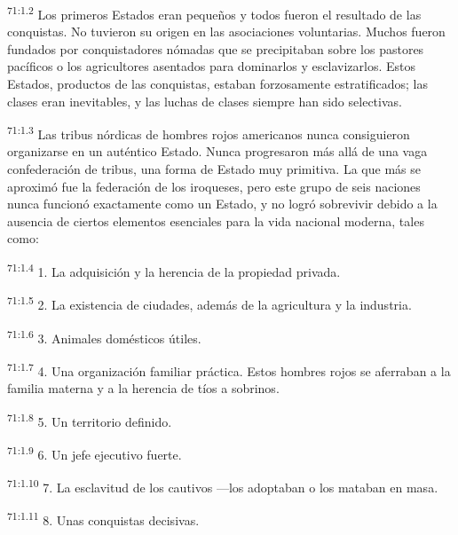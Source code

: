 \documentclass[twoside, 11pt]{book}
\begin{document}
\par
\textsuperscript{71:1.2} Los primeros Estados eran pequeños y todos fueron el resultado de las conquistas. No tuvieron su origen en las asociaciones voluntarias. Muchos fueron fundados por conquistadores nómadas que se precipitaban sobre los pastores pacíficos o los agricultores asentados para dominarlos y esclavizarlos. Estos Estados, productos de las conquistas, estaban forzosamente estratificados; las clases eran inevitables, y las luchas de clases siempre han sido selectivas.

\par
\textsuperscript{71:1.3} Las tribus nórdicas de hombres rojos americanos nunca consiguieron organizarse en un auténtico Estado. Nunca progresaron más allá de una vaga confederación de tribus, una forma de Estado muy primitiva. La que más se aproximó fue la federación de los iroqueses, pero este grupo de seis naciones nunca funcionó exactamente como un Estado, y no logró sobrevivir debido a la ausencia de ciertos elementos esenciales para la vida nacional moderna, tales como:

\par
\textsuperscript{71:1.4} 1. La adquisición y la herencia de la propiedad privada.

\par
\textsuperscript{71:1.5} 2. La existencia de ciudades, además de la agricultura y la industria.

\par
\textsuperscript{71:1.6} 3. Animales domésticos útiles.

\par
\textsuperscript{71:1.7} 4. Una organización familiar práctica. Estos hombres rojos se aferraban a la familia materna y a la herencia de tíos a sobrinos.

\par
\textsuperscript{71:1.8} 5. Un territorio definido.

\par
\textsuperscript{71:1.9} 6. Un jefe ejecutivo fuerte.

\par
\textsuperscript{71:1.10} 7. La esclavitud de los cautivos ---los adoptaban o los mataban en masa.

\par
\textsuperscript{71:1.11} 8. Unas conquistas decisivas.
\end{document}
